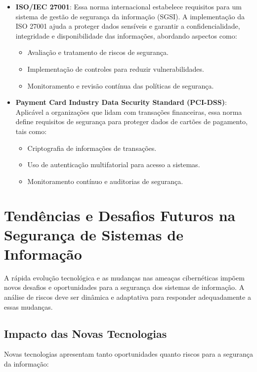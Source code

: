 \documentclass[12pt,oneside,a4paper,article]{abntex2}
\begin{document}
\begin{itemize}
    \item \textbf{ISO/IEC 27001}: Essa norma internacional estabelece requisitos para um sistema de gestão de segurança da informação (SGSI). A implementação da ISO 27001 ajuda a proteger dados sensíveis e garantir a confidencialidade, integridade e disponibilidade das informações, abordando aspectos como:
    \begin{itemize}
        \item Avaliação e tratamento de riscos de segurança.
        \item Implementação de controles para reduzir vulnerabilidades.
        \item Monitoramento e revisão contínua das políticas de segurança.
    \end{itemize}

    \item \textbf{Payment Card Industry Data Security Standard (PCI-DSS)}: Aplicável a organizações que lidam com transações financeiras, essa norma define requisitos de segurança para proteger dados de cartões de pagamento, tais como:
    \begin{itemize}
        \item Criptografia de informações de transações.
        \item Uso de autenticação multifatorial para acesso a sistemas.
        \item Monitoramento contínuo e auditorias de segurança.
    \end{itemize}
\end{itemize}

\section{\textbf{Tendências e Desafios Futuros na Segurança de Sistemas de Informação}}

A rápida evolução tecnológica e as mudanças nas ameaças cibernéticas impõem novos desafios e oportunidades para a segurança dos sistemas de informação. A análise de riscos deve ser dinâmica e adaptativa para responder adequadamente a essas mudanças.

\subsection{Impacto das Novas Tecnologias}

Novas tecnologias apresentam tanto oportunidades quanto riscos para a segurança da informação:
\end{document}

